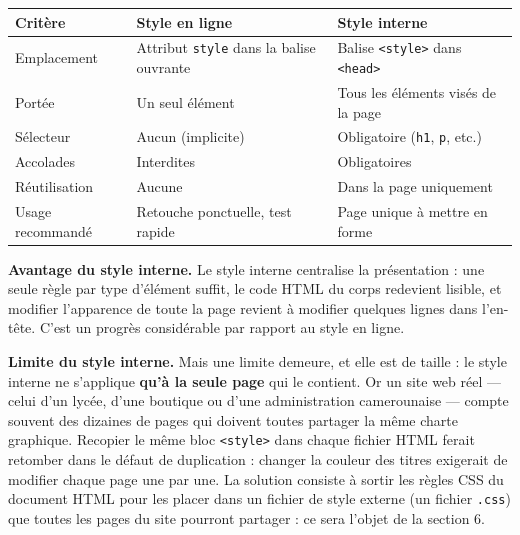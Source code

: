 \documentclass[11pt]{article}
\newcommand{\cle}[1]{{\popxbold\color{popdark}#1}}
\begin{document}
\begin{center}
\begin{tabularx}{\linewidth}{|l|X|X|}
\hline
\rowcolor{popblueL} \textbf{Critère} & \textbf{Style en ligne} & \textbf{Style interne} \\
\hline
Emplacement & Attribut \texttt{style} dans la balise ouvrante & Balise \texttt{<style>} dans \texttt{<head>} \\
\hline
Portée & Un seul élément & Tous les éléments visés de la page \\
\hline
Sélecteur & Aucun (implicite) & Obligatoire (\texttt{h1}, \texttt{p}, etc.) \\
\hline
Accolades & Interdites & Obligatoires \\
\hline
Réutilisation & Aucune & Dans la page uniquement \\
\hline
Usage recommandé & Retouche ponctuelle, test rapide & Page unique à mettre en forme \\
\hline
\end{tabularx}
\end{center}

\textbf{Avantage du style interne.} Le style interne centralise la présentation : une seule règle par type d'élément suffit, le code HTML du corps redevient lisible, et modifier l'apparence de toute la page revient à modifier quelques lignes dans l'en-tête. C'est un progrès considérable par rapport au style en ligne.

\textbf{Limite du style interne.} Mais une limite demeure, et elle est de taille : le style interne ne s'applique \textbf{qu'à la seule page} qui le contient. Or un site web réel — celui d'un lycée, d'une boutique ou d'une administration camerounaise — compte souvent des dizaines de pages qui doivent toutes partager la même charte graphique. Recopier le même bloc \texttt{<style>} dans chaque fichier HTML ferait retomber dans le défaut de duplication : changer la couleur des titres exigerait de modifier chaque page une par une. La solution consiste à sortir les règles CSS du document HTML pour les placer dans un \cle{fichier de style externe} (un fichier \texttt{.css}) que toutes les pages du site pourront partager : ce sera l'objet de la section 6.
\end{document}
